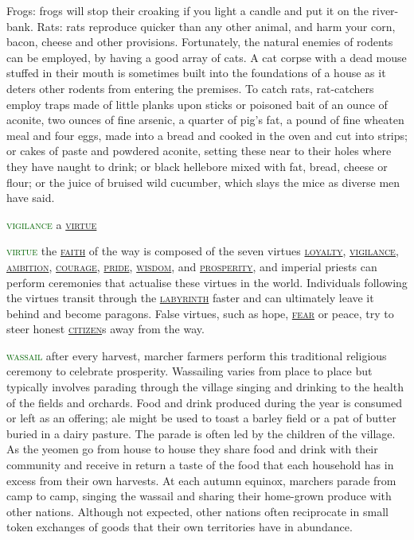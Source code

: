 \documentclass[twoside,11pt,b5paper,twocolumn]{scrbook}
\newcommand{\estcab}[1]{\textsc{\textcolor{marron}{#1}}}
\renewcommand{\paragraph}[1]{\par\noindent\markboth{#1}{#1}\estcab{\textcolor{darkgreen}{#1}}\label{#1} }
\newcommand{\see}[1]{{\estcab{\hyperref[#1]{#1}}}}
\begin{document}
Frogs: frogs will stop their croaking if you light a candle and put it on the river-bank. Rats: rats reproduce quicker than any other animal, and harm your corn, bacon, cheese and other provisions. Fortunately, the natural enemies of rodents can be employed, by having a good array of cats. A cat corpse with a dead mouse stuffed in their mouth is sometimes built into the foundations of a house as it deters other rodents from entering the premises. To catch rats, rat-catchers employ traps made of little planks upon sticks or poisoned bait of an ounce of aconite, two ounces of fine arsenic, a quarter of pig's fat, a pound of fine wheaten meal and four eggs, made into a bread and cooked in the oven and cut into strips; or cakes of paste and powdered aconite, setting these near to their holes where they have naught to drink; or black hellebore mixed with fat, bread, cheese or flour; or the juice of bruised wild cucumber, which slays the mice as diverse men have said.
\paragraph{vigilance} a \see{virtue}
\paragraph{virtue} the \see{faith} of the way is composed of the seven virtues \see{loyalty}, \see{vigilance}, \see{ambition}, \see{courage}, \see{pride}, \see{wisdom}, and \see{prosperity}, and imperial priests can perform ceremonies that actualise these virtues in the world. Individuals following the virtues transit through the \see{labyrinth} faster and can ultimately leave it behind and become paragons. False virtues, such as hope, \see{fear} or peace, try to steer honest \see{citizen}s away from the way.
\paragraph{wassail} after every harvest, marcher farmers perform this traditional religious ceremony to celebrate prosperity. Wassailing varies from place to place but typically involves parading through the village singing and drinking to the health of the fields and orchards. Food and drink produced during the year is consumed or left as an offering; ale might be used to toast a barley field or a pat of butter buried in a dairy pasture. The parade is often led by the children of the village. As the yeomen go from house to house they share food and drink with their community and receive in return a taste of the food that each household has in excess from their own harvests. At each autumn equinox, marchers parade from camp to camp, singing the wassail and sharing their home-grown produce with other nations. Although not expected, other nations often reciprocate in small token exchanges of goods that their own territories have in abundance.
\end{document}
